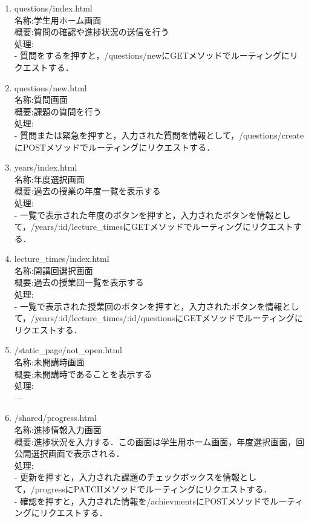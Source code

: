 \begin{enumerate}
\item  questions/index.html \\
名称:学生用ホーム画面 \\
概要:質問の確認や進捗状況の送信を行う \\
処理:\\
- 質問をするを押すと，/questions/newにGETメソッドでルーティングにリクエストする．

\item  questions/new.html \\
名称:質問画面 \\
概要:課題の質問を行う \\
処理:\\
- 質問または緊急を押すと，入力された質問を情報として，/questions/createにPOSTメソッドでルーティングにリクエストする．

\item  years/index.html \\
名称:年度選択画面 \\
概要:過去の授業の年度一覧を表示する \\
処理:\\
- 一覧で表示された年度のボタンを押すと，入力されたボタンを情報として，/years/:id/lecture\_timesにGETメソッドでルーティングにリクエストする．

\item  lecture\_times/index.html \\
名称:開講回選択画面 \\
概要:過去の授業回一覧を表示する \\
処理:\\
- 一覧で表示された授業回のボタンを押すと，入力されたボタンを情報として，/years/:id/lecture\_times/:id/questionsにGETメソッドでルーティングにリクエストする．


\item  /static\_page/not\_open.html \\
名称:未開講時画面 \\
概要:未開講時であることを表示する \\
処理:\\
---

\item  /shared/progress.html \\
名称:進捗情報入力画面 \\
概要:進捗状況を入力する．この画面は学生用ホーム画面，年度選択画面，回公開選択画面で表示される．\\
処理:\\
- 更新を押すと，入力された課題のチェックボックスを情報として，/progressにPATCHメソッドでルーティングにリクエストする．\\
- 確認を押すと，入力された情報を/achievmentsにPOSTメソッドでルーティングにリクエストする．

\end{enumerate}

